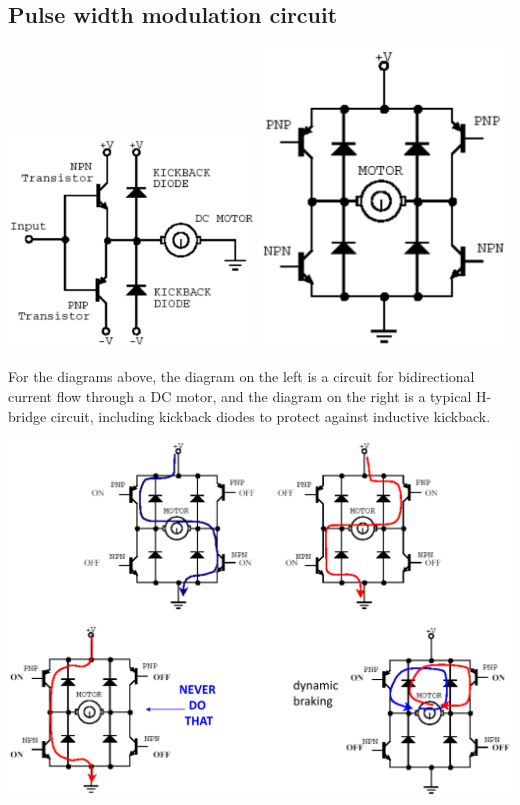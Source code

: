 \documentclass[11pt]{article}
\begin{document}
\subsection{Pulse width modulation circuit}
\label{sec:org593a9a3}
\begin{center}
\includegraphics[width=0.49\textwidth]{./images/pulse-width-modulation-circuit-diagram.png}
\includegraphics[width=0.49\textwidth]{./images/h-bridge-circuit-diagram.png}
\end{center}

For the diagrams above, the diagram on the left is a circuit for bidirectional current flow through a DC motor, and the diagram on the right is a typical H-bridge circuit, including kickback diodes to protect against inductive kickback.

\begin{center}
\includegraphics[width=.9\linewidth]{./images/h-bridge-circuit-possible-current-flows.png}
\end{center}
\end{document}
